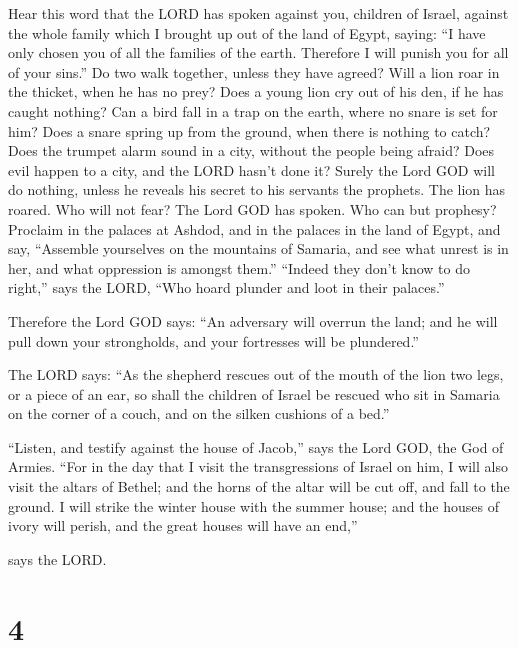  Hear this word that the LORD has spoken against you,
children of Israel, against the whole family which I brought up out of
the land of Egypt, saying:  ``I have only chosen you of
all the families of the earth. Therefore I will punish you for all of
your sins.''  Do two walk together, unless they have
agreed?  Will a lion roar in the thicket, when he has no
prey? Does a young lion cry out of his den, if he has caught nothing?
 Can a bird fall in a trap on the earth, where no snare is
set for him? Does a snare spring up from the ground, when there is
nothing to catch?  Does the trumpet alarm sound in a city,
without the people being afraid? Does evil happen to a city, and the
LORD hasn't done it?  Surely the Lord GOD will do nothing,
unless he reveals his secret to his servants the prophets.
 The lion has roared. Who will not fear? The Lord GOD has
spoken. Who can but prophesy?  Proclaim in the palaces at
Ashdod, and in the palaces in the land of Egypt, and say, ``Assemble
yourselves on the mountains of Samaria, and see what unrest is in her,
and what oppression is amongst them.''  ``Indeed they
don't know to do right,'' says the LORD, ``Who hoard plunder and loot in
their palaces.''

 Therefore the Lord GOD says: ``An adversary will overrun
the land; and he will pull down your strongholds, and your fortresses
will be plundered.''

 The LORD says: ``As the shepherd rescues out of the
mouth of the lion two legs, or a piece of an ear, so shall the children
of Israel be rescued who sit in Samaria on the corner of a couch, and on
the silken cushions of a bed.''

 ``Listen, and testify against the house of Jacob,'' says
the Lord GOD, the God of Armies.  ``For in the day that I
visit the transgressions of Israel on him, I will also visit the altars
of Bethel; and the horns of the altar will be cut off, and fall to the
ground.  I will strike the winter house with the summer
house; and the houses of ivory will perish, and the great houses will
have an end,''

says the LORD.

\hypertarget{section-3}{%
\section{4}\label{section-3}}


